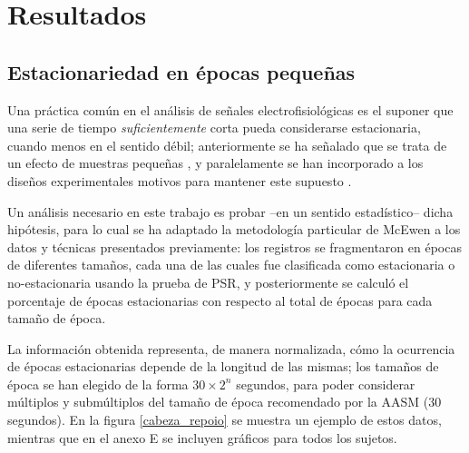 

\chapter{Resultados}

\section{Estacionariedad en épocas pequeñas}

Una práctica común en el análisis de señales electrofisiológicas es el suponer que una serie de 
tiempo \textit{suficientemente} corta pueda considerarse estacionaria, cuando menos en el sentido
débil; anteriormente se ha señalado que se trata de un efecto de muestras pequeñas \cite{Melard89},
y paralelamente se han incorporado a los diseños experimentales motivos para mantener este supuesto
\cite{Kaiser00}.

Un análisis necesario en este trabajo es probar --en un sentido estadístico-- dicha hipótesis, para 
lo cual se ha adaptado la metodología particular de McEwen \cite{McEwen75} a los datos y técnicas 
presentados previamente: los registros se fragmentaron en épocas de diferentes tamaños, cada una de 
las cuales fue clasificada como estacionaria o no-estacionaria usando la prueba de PSR, y 
posteriormente se calculó el porcentaje de épocas estacionarias con respecto al total de épocas
para cada tamaño de época. 

La información obtenida representa, de manera normalizada, cómo la ocurrencia de épocas 
estacionarias depende de la longitud de las mismas; los tamaños de época se han elegido de la forma 
$30\times 2^{n}$ segundos, para poder considerar múltiplos y submúltiplos del tamaño de época
recomendado por la AASM (30 segundos).
En la figura \ref{cabeza_repoio} se muestra un ejemplo de estos datos, mientras que en el anexo E
se incluyen gráficos para todos los sujetos.



